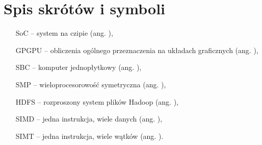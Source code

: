 \chapter{Spis skrótów i symboli}

\begin{itemize}
    \item[SoC] -- system na czipie (ang. ),
    \item[GPGPU] -- obliczenia ogólnego przeznaczenia na układach graficznych (ang. ),
    \item[SBC] -- komputer jednopłytkowy (ang. ),
    \item[SMP] -- wieloprocesorowość symetryczna (ang. ),
    \item[HDFS] -- rozproszony system plików Hadoop (ang. ),
    \item[SIMD] -- jedna instrukcja, wiele danych (ang. ),
    \item[SIMT] -- jedna instrukcja, wiele wątków (ang. ).
\end{itemize}